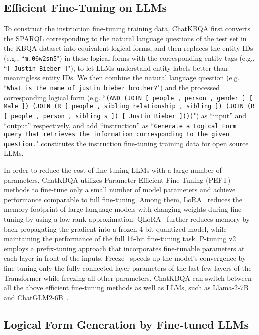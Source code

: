 \documentclass{article} \usepackage{iclr2024_conference,times}
\begin{document}
\subsection{Efficient Fine-Tuning on LLMs }


To construct the instruction fine-tuning training data, ChatKBQA first converts the SPARQL corresponding to the natural language questions of the test set in the KBQA dataset into equivalent logical forms, and then replaces the entity IDs (e.g., ``\texttt{m.06w2sn5}") in these logical forms with the corresponding entity tags (e.g., ``\texttt{[ Justin Bieber ]}"), to let LLMs understand entity labels better than meaningless entity IDs. We then combine the natural language question (e.g. ``\texttt{What is the name of justin bieber brother?}") and the processed corresponding logical form (e.g. ``\texttt{(AND (JOIN [ people , person , gender ] [ Male ]) (JOIN (R [ people , sibling relationship , sibling ]) (JOIN (R [ people , person , sibling s ]) [ Justin Bieber ])))}") as ``input'' and ``output'' respectively, and add ``instruction'' as ``\texttt{Generate a Logical Form query that retrieves the information corresponding to the given question.}" constitutes the instruction fine-tuning training data for open source LLMs.

In order to reduce the cost of fine-tuning LLMs with a large number of parameters, ChatKBQA utilizes Parameter Efficient Fine-Tuning (PEFT)~\citep{PEFT} methods to fine-tune only a small number of model parameters and achieve performance comparable to full fine-tuning. Among them, LoRA~\citep{LoRA} reduces the memory footprint of large language models with changing weights during fine-tuning by using a low-rank approximation. QLoRA~\citep{QLoRA} further reduces memory by back-propagating the gradient into a frozen 4-bit quantized model, while maintaining the performance of the full 16-bit fine-tuning task. P-tuning v2~\citep{P-Tuningv2} employs a prefix-tuning approach that incorporates fine-tunable parameters at each layer in front of the inputs. Freeze~\citep{Freeze} speeds up the model's convergence by fine-tuning only the fully-connected layer parameters of the last few layers of the Transformer while freezing all other parameters. ChatKBQA can switch between all the above efficient fine-tuning methods as well as LLMs, such as Llama-2-7B~\citep{Llama2} and ChatGLM2-6B~\citep{GLM}.

\subsection{Logical Form Generation by Fine-tuned LLMs}
\end{document}

